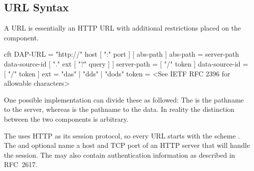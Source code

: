 \documentclass[justify]{nasa-ese}
\begin{document}
\subsection{URL Syntax}
\label{sec-url-syntax}
A \DAP \ac{URL} is essentially an \ac{HTTP}
\ac{URL}\cite{rfc2616}\cite{rfc2396} with additional restrictions
placed on the  component.

\begin{vcode}{cft}
DAP-URL        =  "http://" host [ ":" port ] [ abs-path ]
abs-path       =  server-path data-source-id [ "." ext [ "?" query ] ] 
server-path    =  [ "/" token ] 
data-source-id =  [ "/" token ] 
ext            =  "das" | "dds" | "dods"
token          =  <See IETF RFC 2396 for allowable characters>
\end{vcode}

One possible implementation can divide these as followed: The
 is the pathname to the server, whereas
 is the pathname to the data. In reality the
distinction between the two components is arbitrary.

The \DAP uses \ac{HTTP} as its session protocol\cite{stevens:unp},
so every \DAP \ac{URL} starts with the scheme
. The  and optional  name a host and
TCP port of an \ac{HTTP} server that will handle the session. The
 may also contain authentication information as described in
RFC~2617\cite{rfc2617}.
\end{document}

